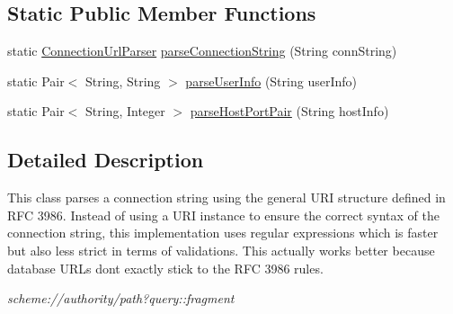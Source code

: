 \subsection*{Static Public Member Functions}
\begin{DoxyCompactItemize}
\item 
static \mbox{\hyperlink{classcom_1_1mysql_1_1cj_1_1conf_1_1_connection_url_parser}{Connection\+Url\+Parser}} \mbox{\hyperlink{classcom_1_1mysql_1_1cj_1_1conf_1_1_connection_url_parser_ad9c8c5abeae754a8e938861add140250}{parse\+Connection\+String}} (String conn\+String)
\item 
static Pair$<$ String, String $>$ \mbox{\hyperlink{classcom_1_1mysql_1_1cj_1_1conf_1_1_connection_url_parser_ab6e4c3d4a5e13537d3746966ffb5c5bb}{parse\+User\+Info}} (String user\+Info)
\item 
static Pair$<$ String, Integer $>$ \mbox{\hyperlink{classcom_1_1mysql_1_1cj_1_1conf_1_1_connection_url_parser_af8c96fb1b935d0e91d1af2268582f9c9}{parse\+Host\+Port\+Pair}} (String host\+Info)
\end{DoxyCompactItemize}


\subsection{Detailed Description}
This class parses a connection string using the general U\+RI structure defined in R\+FC 3986. Instead of using a U\+RI instance to ensure the correct syntax of the connection string, this implementation uses regular expressions which is faster but also less strict in terms of validations. This actually works better because database U\+R\+Ls don\textquotesingle{}t exactly stick to the R\+FC 3986 rules. 

{\itshape scheme\+://authority/path?query\+::fragment} 

